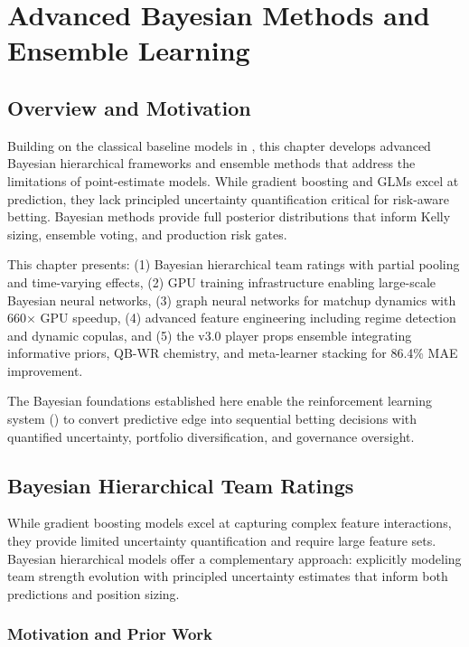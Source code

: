 \chapter{Advanced Bayesian Methods and Ensemble Learning}
\label{chap:advanced_bayesian}
\label{chap:bayesian-models}  %

\section*{Overview and Motivation}
Building on the classical baseline models in , this chapter develops advanced Bayesian hierarchical frameworks and ensemble methods that address the limitations of point-estimate models. While gradient boosting and GLMs excel at prediction, they lack principled uncertainty quantification critical for risk-aware betting. Bayesian methods provide full posterior distributions that inform Kelly sizing, ensemble voting, and production risk gates.

This chapter presents: (1) Bayesian hierarchical team ratings with partial pooling and time-varying effects, (2) GPU training infrastructure enabling large-scale Bayesian neural networks, (3) graph neural networks for matchup dynamics with 660× GPU speedup, (4) advanced feature engineering including regime detection and dynamic copulas, and (5) the v3.0 player props ensemble integrating informative priors, QB-WR chemistry, and meta-learner stacking for 86.4\% MAE improvement.

The Bayesian foundations established here enable the reinforcement learning system () to convert predictive edge into sequential betting decisions with quantified uncertainty, portfolio diversification, and governance oversight.

\section{Bayesian Hierarchical Team Ratings}\label{sec:bayesian-hierarchical}

While gradient boosting models excel at capturing complex feature interactions, they provide limited uncertainty quantification and require large feature sets. Bayesian hierarchical models offer a complementary approach: explicitly modeling team strength evolution with principled uncertainty estimates that inform both predictions and position sizing.

\subsection{Motivation and Prior Work}

